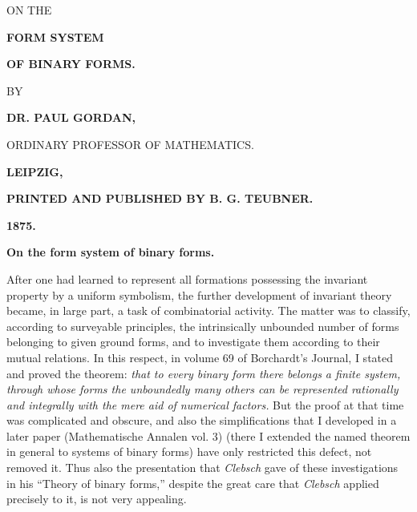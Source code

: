 \documentclass[10pt]{article}
\newcommand{\publishermark}{\begingroup\Large\bfseries\shortstack{B\\[-0.52em]G}\endgroup}
\begin{document}
\small


\begin{center}
{\large ON THE}\par\vspace{1.2em}
{\LARGE\bfseries FORM SYSTEM}\par\vspace{1.4em}
{\Large\bfseries OF BINARY FORMS.}\par\vspace{3em}
{\small BY}\par\vspace{2.5em}
{\large\bfseries DR. PAUL GORDAN,}\par
{\scriptsize ORDINARY PROFESSOR OF MATHEMATICS.}\par\vspace{3.2em}
\publishermark\par\vfill
{\large\bfseries LEIPZIG,}\par
{\bfseries PRINTED AND PUBLISHED BY B. G. TEUBNER.}\par
{\large\bfseries 1875.}
\end{center}

\clearpage

\begin{center}
{\bfseries On the form system of binary forms.}
\end{center}

After one had learned to represent all formations possessing the invariant property by a uniform symbolism, the further development of invariant theory became, in large part, a task of combinatorial activity. The matter was to classify, according to surveyable principles, the intrinsically unbounded number of forms belonging to given ground forms, and to investigate them according to their mutual relations. In this respect, in volume 69 of Borchardt's Journal, I stated and proved the theorem: \emph{that to every binary form there belongs a finite system, through whose forms the unboundedly many others can be represented rationally and integrally with the mere aid of numerical factors.} But the proof at that time was complicated and obscure, and also the simplifications that I developed in a later paper (Mathematische Annalen vol. 3) (there I extended the named theorem in general to systems of binary forms) have only restricted this defect, not removed it. Thus also the presentation that \emph{Clebsch} gave of these investigations in his ``Theory of binary forms,'' despite the great care that \emph{Clebsch} applied precisely to it, is not very appealing.
\end{document}
